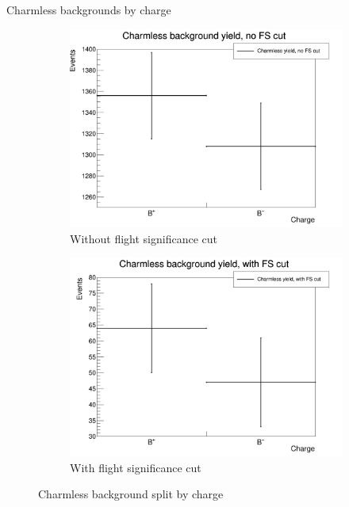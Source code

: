 \documentclass{beamer}
\begin{document}
\begin{frame}{Charmless backgrounds by charge}
  \begin{figure}
    \centering
    \vspace{-0.2cm}
    \begin{subfigure}{0.5\textwidth}
      \includegraphics[width = 1.0\textwidth]{CharmlessYieldsCharge.png}
      \caption{Without flight significance cut}
    \end{subfigure}%
    \begin{subfigure}{0.5\textwidth}
      \includegraphics[width = 1.0\textwidth]{CharmlessYieldsFSCutCharge.png}
      \caption{With flight significance cut}
    \end{subfigure}
    \caption{Charmless background split by charge}
  \end{figure}
\end{frame}
\end{document}
